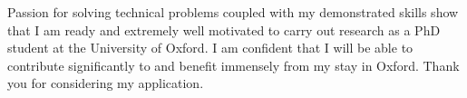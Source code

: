 \documentclass[12pt]{article}
\begin{document}
Passion for solving technical problems coupled with my demonstrated skills show that I am ready and extremely well motivated to carry out research as a PhD student at the University of Oxford. I am confident that I will be able to contribute significantly to and benefit immensely from my stay in Oxford. Thank you for considering my application.



\end{document}
